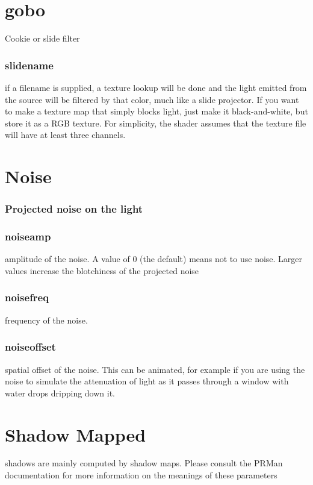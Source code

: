 \documentclass[final,letterpaper,twoside,12pt]{report}
\begin{document}
\section {gobo}
Cookie or slide filter
\subsubsection {slidename}
if a filename is supplied, a texture lookup will be  done and the light emitted from the source will be filtered  by that color, much like a slide projector.  If you want to  make a texture map that simply blocks light, just make it  black-and-white, but store it as a RGB texture.  For  simplicity, the shader assumes that the texture file will  have at least three channels.
\smallskip
\section {Noise}
\subsubsection {Projected noise on the light}
\smallskip
\subsubsection {noiseamp}
amplitude of the noise.  A value of 0 (the default)  means not to use noise.  Larger values increase the blotchiness  of the projected noise
\smallskip
\subsubsection {noisefreq }
frequency of the noise.
\smallskip
\subsubsection {noiseoffset }
spatial offset of the noise.  This can be animated,  for example if you are using the noise to simulate the attenuation of light as it passes through a window with  water drops dripping down it.
\smallskip
\section {Shadow Mapped}
shadows are mainly computed by shadow maps.  Please consult the PRMan documentation for more information on the meanings of these parameters
\end{document}
